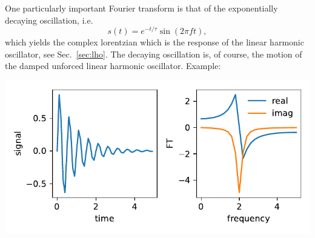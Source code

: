 One particularly important Fourier transform is that of the exponentially decaying oscillation, i.e.
\begin{equation}
    s(t) = e^{-t/\tau}\sin(2\pi f t),
\end{equation}
which yields the complex lorentzian which is the response of the linear harmonic oscillator, see Sec.~\ref{sec:lho}. The decaying oscillation is, of course, the motion of the damped unforced linear harmonic oscillator. Example:

\begin{center}
    \includegraphics{decaying_exponential.pdf}
\end{center}

